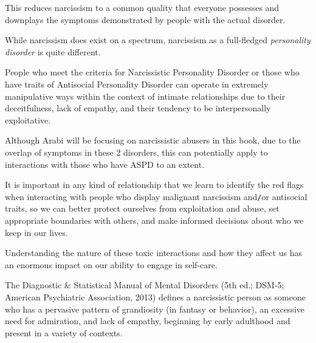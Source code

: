 \documentclass[oneside]{book}
\numberwithin{equation}{section}
\begin{document}
This reduces narcissism to a common quality that everyone possesses and downplays the symptoms demonstrated by people with the actual disorder.

While narcissism does exist on a spectrum, narcissism as a full-fledged \textit{personality disorder} is quite different.

People who meet the criteria for Narcissistic Personality Disorder or those who have traits of Antisocial Personality Disorder can operate in extremely manipulative ways within the context of intimate relationships due to their deceitfulness, lack of empathy, and their tendency to be interpersonally exploitative.

Although Arabi will be focusing on narcissistic abusers in this book, due to the overlap of symptoms in these 2 disorders, this can potentially apply to interactions with those who have ASPD to an extent.

%
It is important in any kind of relationship that we learn to identify the red flags when interacting with people who display malignant narcissism and\texttt{/}or antisocial traits, so we can better protect ourselves from exploitation and abuse, set appropriate boundaries with others, and make informed decisions about who we keep in our lives.

Understanding the nature of these toxic interactions and how they affect us has an enormous impact on our ability to engage in self-care.

The Diagnostic \& Statistical Manual of Mental Disorders (5th ed.; DSM-5; American Psychiatric Association, 2013) defines a narcissistic person as someone who has a pervasive pattern of grandiosity (in fantasy or behavior), an excessive need for admiration, and lack of empathy, beginning by early adulthood and present in a variety of contexts.
\end{document}
